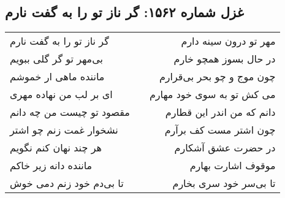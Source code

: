 \begin{center}
\section*{غزل شماره ۱۵۶۲: گر ناز تو را به گفت نارم}
\label{sec:1562}
\begin{longtable}{l p{0.5cm} r}
گر ناز تو را به گفت نارم
&&
مهر تو درون سینه دارم
\\
بی‌مهر تو گر گلی ببویم
&&
در حال بسوز همچو خارم
\\
ماننده ماهی ار خموشم
&&
چون موج و چو بحر بی‌قرارم
\\
ای بر لب من نهاده مهری
&&
می کش تو به سوی خود مهارم
\\
مقصود تو چیست من چه دانم
&&
دانم که من اندر این قطارم
\\
نشخوار غمت زنم چو اشتر
&&
چون اشتر مست کف برآرم
\\
هر چند نهان کنم نگویم
&&
در حضرت عشق آشکارم
\\
ماننده دانه زیر خاکم
&&
موقوف اشارت بهارم
\\
تا بی‌دم خود زنم دمی خوش
&&
تا بی‌سر خود سری بخارم
\\
\end{longtable}
\end{center}

